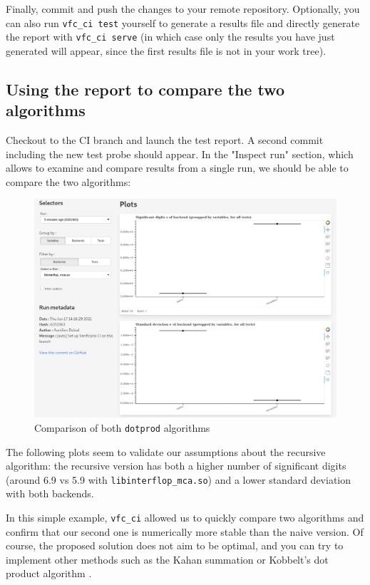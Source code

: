 Finally, commit and push the changes to your remote repository. Optionally, you
can also run \texttt{vfc_ci test} yourself to generate a results file
and directly generate the report with \texttt{vfc_ci serve} (in which case
only the results you have just generated will appear, since the first results
file is not in your work tree).


\subsection{Using the report to compare the two algorithms}

Checkout to the CI branch and launch the test report. A
second commit including the new test probe should appear. In the "Inspect run"
section, which allows to examine and compare results from a single run, we
should be able to compare the two algorithms:

\begin{figure}
\includegraphics[width=\textwidth]{images/naive_vs_recursive.png}
\caption{Comparison of both \texttt{dotprod} algorithms}
\label{naive_vs_recursive}
\end{figure}

The following plots seem to validate our assumptions about the recursive
algorithm: the recursive version has both a higher number of significant
digits (around 6.9 vs 5.9 with \texttt{libinterflop_mca.so}) and a
lower standard deviation with both backends.

In this simple example, \texttt{vfc_ci} allowed us to quickly compare
two algorithms and confirm that our second one is numerically more stable than
the naive version. Of course, the proposed solution does not aim to be optimal,
and you can try to implement other methods such as the Kahan summation
\cite{kahan} or Kobbelt's dot product algorithm \cite{kobbelt}.

